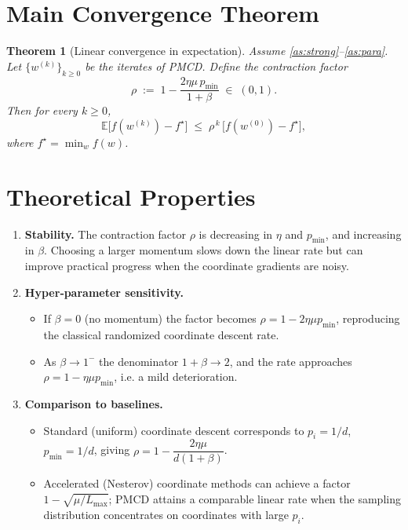 \documentclass{article}
\newtheorem{theorem}{Theorem}
\newcommand{\E}{\mathbb{E}}
\begin{document}
\section*{Main Convergence Theorem}
\begin{theorem}[Linear convergence in expectation]
\label{thm:linear}
Assume \ref{as:strong}--\ref{as:para}. Let $\{w^{(k)}\}_{k\ge0}$ be the iterates of
PMCD. Define the contraction factor
\[
    \rho \;:=\; 1-\frac{2\eta\mu\,p_{\min}}{1+\beta}\;\in\;(0,1).
\tag{4}
\]
Then for every $k\ge0$,
\[
    \E\!\bigl[f(w^{(k)})-f^{\star}\bigr]\;\le\;\rho^{\,k}\,\bigl[f(w^{(0)})-f^{\star}\bigr],
\tag{5}
\]
where $f^{\star}= \min_{w} f(w)$.
\end{theorem}

\section*{Theoretical Properties}
\begin{enumerate}[label=\arabic*)]
\item \textbf{Stability.} The contraction factor $\rho$ is decreasing in $\eta$ and
      $p_{\min}$, and increasing in $\beta$. Choosing a larger momentum slows
      down the linear rate but can improve practical progress when the
      coordinate gradients are noisy.
\item \textbf{Hyper‑parameter sensitivity.}
      \begin{itemize}
        \item If $\beta=0$ (no momentum) the factor becomes $\rho=1-2\eta\mu p_{\min}$,
              reproducing the classical randomized coordinate descent rate.
        \item As $\beta\to 1^{-}$ the denominator $1+\beta\to 2$, and the rate
              approaches $\rho=1-\eta\mu p_{\min}$, i.e. a mild deterioration.
      \end{itemize}
\item \textbf{Comparison to baselines.}
      \begin{itemize}
        \item Standard (uniform) coordinate descent corresponds to $p_i=1/d$,
              $p_{\min}=1/d$, giving $\rho=1-\dfrac{2\eta\mu}{d(1+\beta)}$.
        \item Accelerated (Nesterov) coordinate methods can achieve a factor
              $1-\sqrt{\mu/L_{\max}}$; PMCD attains a comparable linear rate
              when the sampling distribution concentrates on coordinates with
              large $p_i$.
      \end{itemize}
\end{enumerate}
\end{document}
